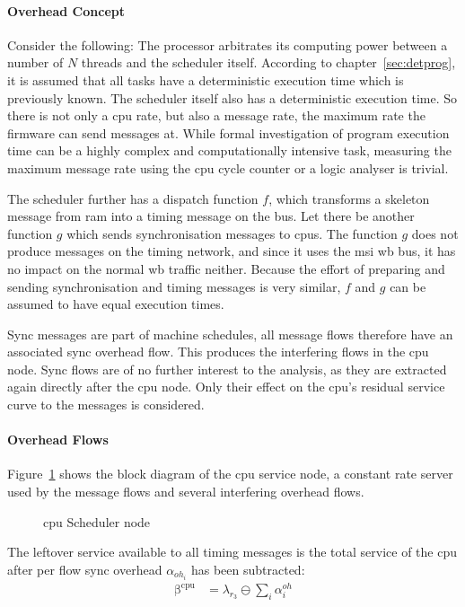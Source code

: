 \paragraph{Overhead Concept}
Consider the following: The processor arbitrates its computing power between a number of $N$ threads and the scheduler itself.
According to chapter~\ref{sec:detprog}, it is assumed that all tasks have a deterministic execution time which is previously known.
The scheduler itself also has a deterministic execution time.
So there is not only a \gls{cpu} rate, but also a message rate, the maximum rate the firmware can send messages at.
While formal investigation of program execution time can be a highly complex and computationally intensive task, measuring the maximum message rate using the \gls{cpu} cycle counter
or a logic analyser is trivial. 
\par
The scheduler further has a dispatch function $f$, which transforms a skeleton message from \gls{ram}
into a timing message on the bus. Let there be another function $g$ which sends synchronisation messages to \gls{cpu}s.
The function $g$ does not produce messages on the timing network, and since it uses the \gls{msi} \gls{wb} bus, it has no impact on the normal \gls{wb} traffic neither.
Because the effort of preparing and sending synchronisation and timing messages is very similar, $f$ and $g$ can be assumed to have equal execution times.
\par
Sync messages are part of machine schedules, all message flows therefore have an associated sync overhead flow.
This produces the interfering flows in the \gls{cpu} node. Sync flows are of no further interest to the analysis, as they are extracted again directly after the \gls{cpu} node. Only their effect on the \gls{cpu}'s residual service curve to the messages is considered.
\paragraph{Overhead Flows}
Figure~\ref{fig:lm32-edf} shows the block diagram of the \gls{cpu} service node, a constant rate server used by the message flows and several interfering overhead flows. 
%
\begin{figure}[H]
  \centering
  \def\svgwidth{0.25\textwidth}
  
  \caption{\gls{cpu} Scheduler node}
  \label{fig:lm32-edf}
\end{figure}
\noindent
The leftover service available to all timing messages is the total service of the \gls{cpu} after per flow sync overhead $\alpha_{{oh}_i}$ has been subtracted: 
\begin{align}
\mathrm{\beta^{cpu}} &= \lambda_{r_3} \ominus \sum_i \alpha^{oh}_i
\label{eq:sched_cpu_serv}
\end{align}
%
